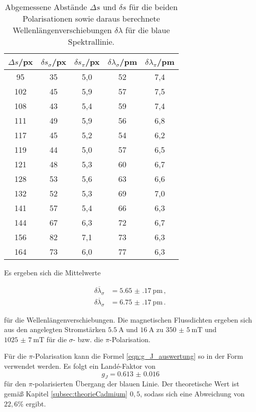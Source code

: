 \begin{table}[htp]
	\begin{center}
    \caption{Abgemessene Abstände $\Delta s$ und $\delta s$ für die beiden Polarisationen sowie daraus berechnete Wellenlängenverschiebungen $\delta \lambda$ für die blaue Spektrallinie.}
    \label{tab:blau}
		\begin{tabular}{ccccc}
		\toprule
			{$\Delta s$/px} & {${\delta s}_\sigma$/px} & {${\delta s}_\pi$/px} & {${\delta \lambda}_\sigma$/pm} & {${\delta \lambda}_\pi$/pm}\\
			\midrule
			 95 & 35 & 5,0 & 52 & 7,4\\
			102 & 45 & 5,9 & 57 & 7,5\\
			108 & 43 & 5,4 & 59 & 7,4\\
			111 & 49 & 5,9 & 56 & 6,8\\
			117 & 45 & 5,2 & 54 & 6,2\\
			119 & 44 & 5,0 & 57 & 6,5\\
			121 & 48 & 5,3 & 60 & 6,7\\
			128 & 53 & 5,6 & 63 & 6,6\\
			132 & 52 & 5,3 & 69 & 7,0\\
			141 & 57 & 5,4 & 66 & 6,3\\
			144 & 67 & 6,3 & 72 & 6,7\\
			156 & 82 & 7,1 & 73 & 6,3\\
			164 & 73 & 6,0 & 77 & 6,3\\
		\bottomrule
		\end{tabular}
	\end{center}
\end{table}

Es ergeben sich die Mittelwerte

\begin{align*}
  \overline{{\delta \lambda}_\sigma} &= \SI{5.65(17)}{\pico\meter}\,,\\
  \overline{{\delta \lambda}_\sigma} &= \SI{6.75(17)}{\pico\meter}\,.
\end{align*}

für die Wellenlängenverschiebungen.
Die magnetischen Flussdichten ergeben sich aus den angelegten Stromstärken $\SI{5.5}{\ampere}$ und $\SI{16}{\ampere}$ zu $\SI{350(5)}{\milli\tesla}$ und $\SI{1025(7)}{\milli\tesla}$ für die $\sigma$- bzw. die $\pi$-Polarisation.

Für die $\pi$-Polarisation kann die Formel \eqref{eqn:g_J_auswertung} so in der Form verwendet werden. Es folgt ein Landé-Faktor von
\begin{equation*}
  g_J = \num{0.613(16)}
\end{equation*}
für den $\pi$-polarisierten Übergang der blauen Linie. Der theoretische Wert ist gemäß Kapitel \ref{subsec:theorieCadmium} $0{,}5$, sodass sich eine Abweichung von $22{,}6\%$ ergibt.

